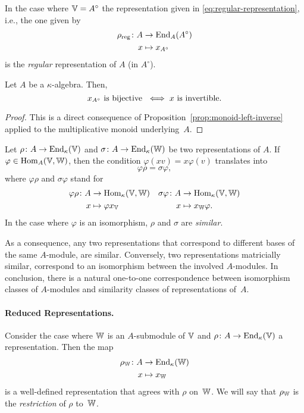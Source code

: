 \begin{defn}\label{defn:regular-representation}
    In the case where $\mathbb V=A^\circ$ the representation given in \eqref{eq:regular-representation}, i.e., the one given by
    \begin{align*}
        \rho_{\mathrm{reg}}\colon A&\to{\operatorname{End}}_A(A^\circ)\\ 
        x&\mapsto x_{A^\circ}
    \end{align*}
    is the \textsl{regular} representation of $A$ (in $A^\circ$).
\end{defn}

\begin{prop}
    Let $A$ be a $\kappa$-algebra. Then,
    $$
        x_{A^\circ} \text{\rm\ is bijective }
        \iff x \text{\rm\ is invertible}.
    $$
\end{prop}

\begin{proof}
    This is a direct consequence of Proposition~\ref{prop:monoid-left-inverse} applied to the multiplicative monoid underlying~$A$.
\end{proof}

\begin{rem}[Similarity]\label{rem:similarity} Let $\rho\colon A\to{\operatorname{End}}_\kappa(\mathbb V)$ and $\sigma\colon A\to{\operatorname{End}}_\kappa(\mathbb W)$ be two representations of $A$. If $\varphi\in{\rm Hom}_A(\mathbb V,\mathbb W)$, then the condition $\varphi(xv)=x\varphi(v)$ translates into 
$$
    \varphi\rho=\sigma\varphi,
$$
where $\varphi\rho$ and $\sigma\varphi$ stand for
\begin{align*}
    \varphi\rho\colon A&\to{\rm Hom}_\kappa(\mathbb V,\mathbb W)
    &\sigma\varphi\colon A&\to{\rm Hom}_\kappa(\mathbb V,\mathbb W)\\
    x&\mapsto\varphi x_\mathbb V
    &x&\mapsto x_\mathbb W\varphi.
\end{align*}
In the case where $\varphi$ is an isomorphism, $\rho$ and $\sigma$ are \textsl{similar}.

As a consequence, any two representations that correspond to different bases of the same $A$-module, are similar. Conversely, two representations matricially similar, correspond to an isomorphism between the involved $A$-modules. In conclusion, there is a natural
one-to-one correspondence between isomorphism classes of $A$-modules and similarity classes of representations of~$A$. 
\end{rem}

\paragraph{Reduced Representations.}\label{page:reudced-representations} Consider the case where $\mathbb W$ is an $A$-submodule of $\mathbb V$ and $\rho\colon A\to{\operatorname{End}}_\kappa(\mathbb V)$ a representation. Then the map \begin{align*}
    \rho_\mathbb W\colon A&\to{\operatorname{End}}_\kappa(\mathbb W)\\
    x&\mapsto x_\mathbb W
\end{align*}
is a well-defined representation that agrees with $\rho$ on~$\mathbb W$. We will say that $\rho_\mathbb W$ is the \textsl{restriction} of $\rho$ to~$\mathbb W$.

